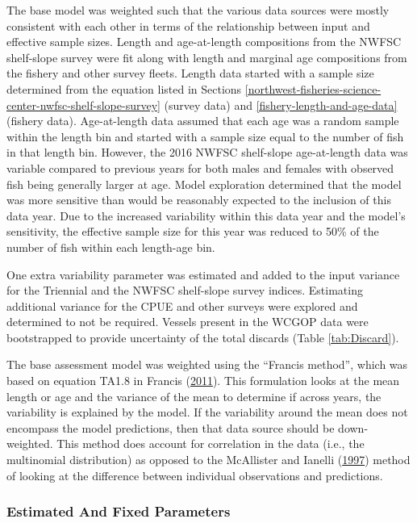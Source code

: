 \documentclass[12pt,]{article}
\begin{document}
The base model was weighted such that the various data sources were
mostly consistent with each other in terms of the relationship between
input and effective sample sizes. Length and age-at-length compositions
from the NWFSC shelf-slope survey were fit along with length and
marginal age compositions from the fishery and other survey fleets.
Length data started with a sample size determined from the equation
listed in Sections
\ref{northwest-fisheries-science-center-nwfsc-shelf-slope-survey}
(survey data) and \ref{fishery-length-and-age-data} (fishery data).
Age-at-length data assumed that each age was a random sample within the
length bin and started with a sample size equal to the number of fish in
that length bin. However, the 2016 NWFSC shelf-slope age-at-length data
was variable compared to previous years for both males and females with
observed fish being generally larger at age. Model exploration
determined that the model was more sensitive than would be reasonably
expected to the inclusion of this data year. Due to the increased
variability within this data year and the model's sensitivity, the
effective sample size for this year was reduced to 50\% of the number of
fish within each length-age bin.

One extra variability parameter was estimated and added to the input
variance for the Triennial and the NWFSC shelf-slope survey indices.
Estimating additional variance for the CPUE and other surveys were
explored and determined to not be required. Vessels present in the WCGOP
data were bootstrapped to provide uncertainty of the total discards
(Table \ref{tab:Discard}).

The base assessment model was weighted using the ``Francis method'',
which was based on equation TA1.8 in Francis
(\protect\hyperlink{ref-francis_data_2011}{2011}). This formulation
looks at the mean length or age and the variance of the mean to
determine if across years, the variability is explained by the model. If
the variability around the mean does not encompass the model
predictions, then that data source should be down-weighted. This method
does account for correlation in the data (i.e., the multinomial
distribution) as opposed to the McAllister and Ianelli
(\protect\hyperlink{ref-mcallister_bayesian_1997}{1997}) method of
looking at the difference between individual observations and
predictions.

\subsubsection{Estimated And Fixed
Parameters}\label{estimated-and-fixed-parameters}
\end{document}
